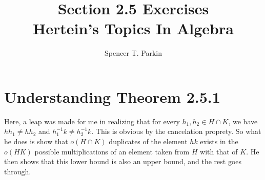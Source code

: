 \documentclass[12pt]{article}
\title{Section 2.5 Exercises\\Hertein's Topics In Algebra}
\author{Spencer T. Parkin}
\begin{document}
\maketitle

\section*{Understanding Theorem 2.5.1}

Here, a leap was made for me in realizing that for every $h_1,h_2\in H\cap K$,
we have $hh_1\neq hh_2$ and $h_1^{-1}k\neq h_2^{-1}k$.  This is obvious by
the cancelation proprety.  So what he does is show that $o(H\cap K)$ duplicates
of the element $hk$ exists in the $o(HK)$ possible multiplications of an element
taken from $H$ with that of $K$.  He then shows that this lower bound is also
an upper bound, and the rest goes through.
\end{document}

